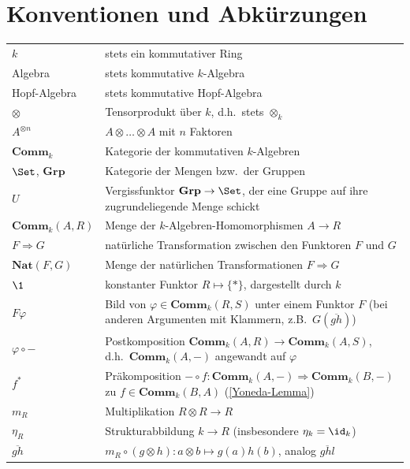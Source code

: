 \documentclass[11pt]{article}
\newcommand{\Comm}{\mathbf{Comm}}
\newcommand{\Nat}{\mathbf{Nat}}
\newcommand{\Grp}{\mathbf{Grp}}
\begin{document}
\section*{Konventionen und Abkürzungen} 
\vspace{-10pt}
\begin{table}[H]
    \centering
    \renewcommand{\arraystretch}{1.35}
    \begin{tabularx}{\textwidth}{>{\raggedleft\arraybackslash}p{2.5cm}||X}
        $k$ & stets ein kommutativer Ring \\
        Algebra & stets kommutative $k$-Algebra \\
        Hopf-Algebra & stets kommutative Hopf-Algebra \\
        $\otimes$ & Tensorprodukt über $k$, d.h.\ stets $\otimes_k$ \\
        $A^{\otimes n}$ & $A\otimes\dots\otimes A$ mit $n$ Faktoren \\
        $\Comm_k$ & Kategorie der kommutativen $k$-Algebren \\
        $\Set$, $\Grp$ & Kategorie der Mengen bzw.\ der Gruppen \\
        $U$ & Vergissfunktor $\Grp\to\Set$, der eine Gruppe auf ihre zugrundeliegende Menge schickt \\
        $\Comm_k(A,R)$ & Menge der $k$-Algebren-Homomorphismen $A\to R$ \\
        $F\Rightarrow G$ & natürliche Transformation zwischen den Funktoren $F$ und $G$ \\
        $\Nat(F,G)$ & Menge der natürlichen Transformationen $F\Rightarrow G$ \\
        $\1$ & konstanter Funktor $R\mapsto\{*\}$, dargestellt durch $k$ \\
        $F\varphi$ & Bild von $\varphi\in\Comm_k(R,S)$ unter einem Funktor $F$ (bei anderen Argumenten mit Klammern, z.B.\ $G(\overline{gh})$) \\
        $\varphi\circ-$ & Postkomposition $\Comm_k(A,R)\to\Comm_k(A,S)$, d.h.\ $\Comm_k(A,-)$ angewandt auf $\varphi$ \\
        $f^*$ & Präkomposition $-\circ f:\Comm_k(A,-)\Rightarrow\Comm_k(B,-)$ zu $f\in\Comm_k(B,A)$ (\ref{Yoneda-Lemma}) \\
        $m_R$ & Multiplikation $R\otimes R\to R$ \\
        $\eta_R$ & Strukturabbildung $k\to R$ (insbesondere $\eta_k=\id_k$) \\
           $\overline{gh}$ & $m_R\circ(g\otimes h): a\otimes b\mapsto g(a)h(b)$, analog $\overline{ghl}$ \\

\end{tabularx}
\end{table}
\end{document}
